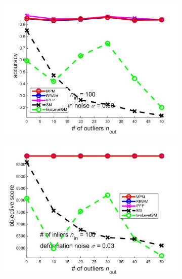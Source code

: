 \documentclass[
	fontsize=12pt,
	paper=a4,
	twoside=false,
	numbers=noenddot,
	plainheadsepline,
	toc=listof,
	toc=bibliography
]{scrartcl}
\begin{document}
\begin{figure}[ht] 
	\begin{subfigure}[b]{0.3\textwidth}
		\centering
		\includegraphics[scale=0.25]{"fig_ver2108/syntheticPointSets/outliertest_n50/accuracy_avg10tests"} 
	\end{subfigure}%
	\begin{subfigure}[b]{0.3\textwidth}
		\centering
		\includegraphics[scale=0.25]{"fig_ver2108/syntheticPointSets/outliertest_n50/score_avg10tests"} 
	\end{subfigure} 
	\begin{subfigure}[b]{0.3\textwidth}
		\centering

\end{subfigure}
\end{figure}
\end{document}

